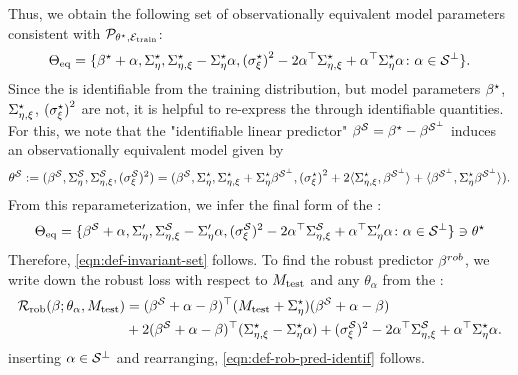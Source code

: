 Thus, we obtain the following set of observationally equivalent model parameters consistent with $\mathcal{P}_{\theta^{\star}, \mathcal{E}_{\mathrm{train}}}$:
\begin{align*}
    \Theta_{\mathrm{eq}} = \{ \beta^{\star} + \alpha, \Sigma^\star_{\eta}, \Sigma^\star_{\eta,\xi} - \Sigma^\star_{\eta} \alpha, {(\sigma_\xi^\star)}^2 - 2 \alpha^\top \Sigma^\star_{\eta,\xi} + \alpha^\top \Sigma^\star_{\eta} \alpha \colon \alpha \in \mathcal{S}^\perp \}. 
\end{align*}
Since the \idset is identifiable from the training distribution, but model parameters $\beta^{\star}$, $\Sigma^\star_{\eta,\xi}$, ${(\sigma_\xi^\star)}^2$ are not, it is helpful to re-express the \idset through identifiable quantities. For this, we note that the "identifiable linear predictor" $\beta^{\mathcal{S}} = \beta^{\star} - \beta^{\mathcal{S}^\perp}$ induces an observationally equivalent model given by 
\begin{align*}
    \theta^{\mathcal{S}} := (\beta^{\mathcal{S}}, \Sigma^{\mathcal{S}}_{\eta}, \Sigma^{\mathcal{S}}_{\eta,\xi}, ({\sigma_\xi^{\mathcal{S}}})^2) = (\beta^{\mathcal{S}}, \Sigma^\star_{\eta}, \Sigma^\star_{\eta,\xi} + \Sigma^\star_{\eta} \beta^{\mathcal{S}^\perp}, {(\sigma_\xi^\star)}^2 + 2 \langle \Sigma^\star_{\eta,\xi}, \beta^{\mathcal{S}^\perp}\rangle + \langle \beta^{\mathcal{S}^\perp}, \Sigma^\star_{\eta} \beta^{\mathcal{S}^\perp}\rangle).
\end{align*}
From this reparameterization, we infer the final form of the \idset:
\begin{align*}
   \Theta_{\mathrm{eq}} = \{ \beta^{\mathcal{S}} + \alpha, \Sigma_{\eta}', \Sigma^{\mathcal{S}}_{\eta,\xi} - \Sigma_{\eta}' \alpha, ({\sigma_\xi^{\mathcal{S}}})^2 - 2 \alpha^\top \Sigma^{\mathcal{S}}_{\eta,\xi} + \alpha^\top \Sigma_{\eta}' \alpha \colon \alpha \in \mathcal{S}^\perp \}  \ni \theta^{\star} 
\end{align*}
Therefore, \cref{eqn:def-invariant-set} follows.
To find the robust predictor $\beta^{rob}$, we write down the robust loss with respect to $M_{\mathrm{test}}$ and any $\theta_\alpha$ from the \idset:
\begin{align*}
    \mathcal{R}_{\mathrm{rob}}(\beta;\theta_\alpha, M_{\mathrm{test}}) &= (\beta^{\mathcal{S}} + \alpha - \beta)^\top (M_{\mathrm{test}} + \Sigma^\star_{\eta}) (\beta^{\mathcal{S}} + \alpha - \beta) \\ &+ 2 (\beta^{\mathcal{S}} + \alpha - \beta)^\top (\Sigma^\star_{\eta,\xi} - \Sigma^\star_{\eta} \alpha) + ({\sigma_\xi^{\mathcal{S}}})^2 - 2 \alpha^\top \Sigma^{\mathcal{S}}_{\eta,\xi} + \alpha^\top \Sigma^\star_{\eta} \alpha.
\end{align*}
inserting $\alpha \in \mathcal{S}^\perp$ and rearranging, \cref{eqn:def-rob-pred-identif} follows.

